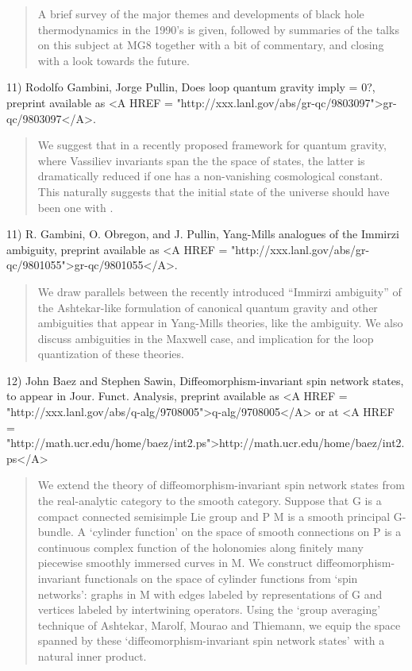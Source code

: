 \begin{quote}
     A brief survey of the major themes and developments of black hole
     thermodynamics in the 1990's is given, followed by summaries of the
     talks on this subject at MG8 together with a bit of commentary,
     and closing with a look towards the future.
\end{quote}


11) Rodolfo Gambini, Jorge Pullin, Does loop quantum gravity imply 
\Lambda  = 0?, preprint available as <A HREF = "http://xxx.lanl.gov/abs/gr-qc/9803097">gr-qc/9803097</A>.

\begin{quote}
     We suggest that in a recently proposed framework for quantum
     gravity, where Vassiliev invariants span the the space of states,
     the latter is dramatically reduced if one has a non-vanishing
     cosmological constant. This naturally suggests that the initial
     state of the universe should have been one with .
\end{quote}

11) R. Gambini, O. Obregon, and J. Pullin, Yang-Mills analogues of the 
Immirzi ambiguity, preprint available as <A HREF = "http://xxx.lanl.gov/abs/gr-qc/9801055">gr-qc/9801055</A>.  

\begin{quote}
     We draw parallels between the recently introduced ``Immirzi
     ambiguity'' of the Ashtekar-like formulation of canonical quantum
     gravity and other ambiguities that appear in Yang-Mills theories,
     like the \theta  ambiguity. We also discuss ambiguities in the
     Maxwell case, and implication for the loop quantization of these
     theories.
\end{quote}

12) John Baez and Stephen Sawin, Diffeomorphism-invariant spin network 
states, to appear in Jour. Funct. Analysis, preprint available as
<A HREF = "http://xxx.lanl.gov/abs/q-alg/9708005">q-alg/9708005</A> or at 
<A HREF = "http://math.ucr.edu/home/baez/int2.ps">http://math.ucr.edu/home/baez/int2.ps</A>

\begin{quote}
     We extend the theory of diffeomorphism-invariant spin network
     states from the real-analytic category to the smooth
     category.  Suppose that G is a compact connected semisimple Lie
     group and P \to  M is a smooth principal G-bundle.  A `cylinder
     function' on the space of smooth connections on P is a continuous
     complex function of the holonomies along finitely many piecewise
     smoothly immersed curves in M.  We construct diffeomorphism-invariant 
     functionals on the space of cylinder functions from `spin networks': 
     graphs in M with edges labeled by representations of G and vertices 
     labeled by intertwining operators. Using the `group averaging' 
     technique of Ashtekar, Marolf, Mourao and Thiemann, we equip the 
     space spanned by these `diffeomorphism-invariant spin network states' 
     with a natural inner product. 
\end{quote}

